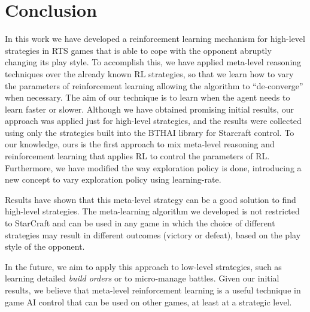 \chapter{Conclusion}
\label{chapter:conclusion}

In this work we have developed a reinforcement learning mechanism for high-level strategies in RTS games that is able to cope with the opponent abruptly changing its play style.
To accomplish this, we have applied meta-level reasoning techniques over the already known RL strategies, so that we learn how to vary the parameters of reinforcement learning allowing the algorithm to ``de-converge'' when necessary.
The aim of our technique is to learn when the agent needs to learn faster or slower. 
Although we have obtained promising initial results, our approach was applied just for high-level strategies, and the results were collected using only the strategies built into the BTHAI library for Starcraft control.
To our knowledge, ours is the first approach to mix meta-level reasoning and reinforcement learning that applies RL to control the parameters of RL.
Furthermore, we have modified the way exploration policy is done, introducing a new concept to vary exploration policy using learning-rate.

Results have shown that this meta-level strategy can be a good solution to find high-level strategies.
The meta-learning algorithm we developed is not restricted to StarCraft and can be used in any game in which the choice of different strategies may result in different outcomes (victory or defeat), based on the play style of the opponent. 

In the future, we aim to apply this approach to low-level strategies, such as learning detailed \textit{build orders} or to micro-manage battles.
Given our initial results, we believe that meta-level reinforcement learning is a useful technique in game AI control that can be used on other games, at least at a strategic level.